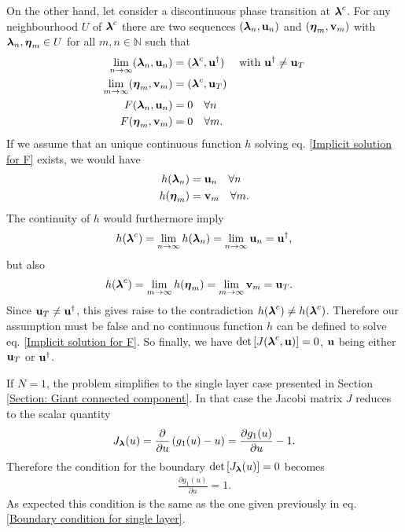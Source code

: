 \documentclass[
11pt, %
english, %
singlespacing, %
nolistspacing, %
liststotoc, %
headsepline, %
]{MastersDoctoralThesis} %
\begin{document}
On the other hand, let consider a discontinuous phase transition at $\boldsymbol{\mathrm{\lambda}}^c$. For any neighbourhood $U$ of $\boldsymbol{\mathrm{\lambda}}^c$ there are two sequences $(\boldsymbol{\mathrm{\lambda}}_n, \boldsymbol{\mathrm{u}}_n)$ and $(\boldsymbol{\mathrm{\eta}}_m, \boldsymbol{\mathrm{v}}_m)$ with $\boldsymbol{\mathrm{\lambda}}_n, \boldsymbol{\mathrm{\eta}}_m \in U$ for all $m, n \in \mathbb{N}$ such that
\begin{align}
	\lim_{n \rightarrow \infty} (\boldsymbol{\mathrm{\lambda}}_n, \boldsymbol{\mathrm{u}}_n) &= (\boldsymbol{\mathrm{\lambda}}^c, \boldsymbol{\mathrm{u}}^\dagger) \quad \text{ with } \boldsymbol{\mathrm{u}}^\dagger \neq \boldsymbol{\mathrm{u}}_T \\
	\lim_{m \rightarrow \infty} (\boldsymbol{\mathrm{\eta}}_m, \boldsymbol{\mathrm{v}}_m) &= (\boldsymbol{\mathrm{\lambda}}^c, \boldsymbol{\mathrm{u}}_T) \\
	F(\boldsymbol{\mathrm{\lambda}}_n, \boldsymbol{\mathrm{u}}_n) &= 0 \quad \forall n \\
	F(\boldsymbol{\mathrm{\eta}}_m, \boldsymbol{\mathrm{v}}_m) &= 0 \quad \forall m.
\end{align}
If we assume that an unique continuous function $h$ solving eq. \eqref{Implicit solution for F} exists, we would have
\begin{align}
	h(\boldsymbol{\mathrm{\lambda}}_n) &= \boldsymbol{\mathrm{u}}_n \quad \forall n \\
	h(\boldsymbol{\mathrm{\eta}}_m) &= \boldsymbol{\mathrm{v}}_m \quad \forall m.
\end{align}
The continuity of $h$ would furthermore imply
\begin{align}
	h(\boldsymbol{\mathrm{\lambda}}^c) = \lim_{n \rightarrow \infty} h(\boldsymbol{\mathrm{\lambda}}_n) = \lim_{n \rightarrow \infty} \boldsymbol{\mathrm{u}}_n = \boldsymbol{\mathrm{u}}^\dagger,
\end{align}
but also
\begin{align}
	h(\boldsymbol{\mathrm{\lambda}}^c) &= \lim_{m \rightarrow \infty} h(\boldsymbol{\mathrm{\eta}}_m) = \lim_{m \rightarrow \infty} \boldsymbol{\mathrm{v}}_m = \boldsymbol{\mathrm{u}}_T.
\end{align}
Since $\boldsymbol{\mathrm{u}}_T \neq \boldsymbol{\mathrm{u}}^\dagger$, this gives raise to the contradiction $h(\boldsymbol{\mathrm{\lambda}}^c) \neq h(\boldsymbol{\mathrm{\lambda}}^c)$. Therefore our assumption must be false and no continuous function $h$ can be defined to solve eq. \eqref{Implicit solution for F}. So finally, we have $\det\left[ J(\boldsymbol{\mathrm{\lambda}}^c, \boldsymbol{\mathrm{u}}) \right] = 0$, $\boldsymbol{\mathrm{u}}$ being either $\boldsymbol{\mathrm{u}}_T$ or $\boldsymbol{\mathrm{u}}^\dagger$.

If $N = 1$, the problem simplifies to the single layer case presented in Section \ref{Section: Giant connected component}. In that case the Jacobi matrix $J$ reduces to the scalar quantity
\begin{align}
	J_{\boldsymbol{\mathrm{\lambda}}}(u) = \frac{\partial}{\partial u} \left(g_1(u) - u\right) = \frac{\partial g_1(u)}{\partial u} - 1.
\end{align}
Therefore the condition for the boundary $\det \left[ J_{\boldsymbol{\mathrm{\lambda}}}(u)\right] = 0$ becomes
\begin{align}
	\frac{\partial g_1(u)}{\partial u} = 1.
\end{align}
As expected this condition is the same as the one given previously in eq. \eqref{Boundary condition for single layer}.
\end{document}
